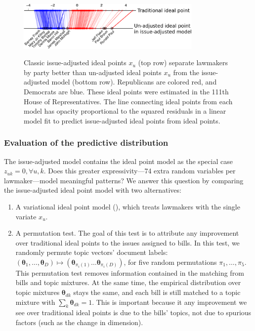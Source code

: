 \begin{figure}
  \center
  \includegraphics[width=0.8\textwidth]{chapter_spatial_voting_with_text/figures/3393_issue_vs_ideal_sxs.pdf}
  \label{fig:jackman_vs_offset}
  \caption{Classic issue-adjusted ideal points $x_u$ (top row) separate lawmakers by party better than un-adjusted ideal points $x_u$ from the
    issue-adjusted model (bottom row).  Republicans are colored red,
    and Democrats are blue.  These ideal points were estimated in
    the 111th House of Representatives.  The line connecting ideal points from
    each model has opacity proportional to the squared residuals in a linear
    model fit to predict issue-adjusted ideal points from ideal
    points. }
\end{figure}

\subsubsection{Evaluation of the predictive distribution}

The issue-adjusted model contains the ideal point model as the
special case $z_{uk}=0, \forall u, k$. Does this greater
expressivity---74 extra random variables per lawmaker---model
meaningful patterns?  We answer this question by comparing the
issue-adjusted ideal point model with two alternatives:

\begin{enumerate}
\item A variational ideal point model (), which treats
  lawmakers with the single variate $x_u$.

\item A permutation test.  The goal of this test is to attribute any
  improvement over traditional ideal points to the issues assigned to
  bills.  In this test, we randomly permute topic vectors' document
  labels: $(\bm \theta_1, \ldots, \bm \theta_D) \mapsto (\bm
  \theta_{\pi_i(1)} \ldots \bm \theta_{\pi_i(D)})$, for five random
  permutations $\pi_1, \ldots, \pi_{5}$.  This permutation test
  removes information contained in the matching from bills and topic
  mixtures.  At the same time, the empirical distribution over topic
  mixtures $\bm \theta_{dk}$ stays the same, and each bill is still
  matched to a topic mixture with $\sum_k \bm \theta_{dk} = 1$.  This
  is important because it any improvement we see over traditional
  ideal points is due to the bills' topics, not due to spurious
  factors (such as the change in dimension).
\end{enumerate}

